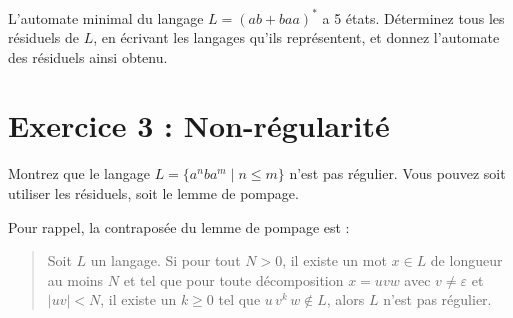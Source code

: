 \documentclass{fancy-article}
\begin{document}
  L'automate minimal du langage $L = (ab+baa)^*$ a 5 états. Déterminez
  tous les résiduels de $L$, en écrivant les langages qu'ils
  représentent, et donnez l’automate des résiduels ainsi obtenu.

\vfill

\section*{Exercice 3 : Non-régularité}

  Montrez que le langage $L=\{ a^{n} b a^{m} \mid n \leq m\}$ n'est pas régulier. Vous pouvez
  soit utiliser les résiduels, soit le lemme de pompage.


   \noindent Pour rappel, la contraposée du lemme de pompage est :
   \begin{quote}
    Soit $L$ un langage. 
   Si pour tout $N >0$, il existe un mot $x \in L$ de longueur au moins
   $N$ et tel que pour toute décomposition $x=uvw$ avec $v
   \neq\varepsilon$ et $|uv| <N$, il existe un $k \ge 0$ tel que $u\,
   v^k \, w \notin L$, alors $L$ n'est pas régulier.
   \end{quote}

\vfill
\end{document}
